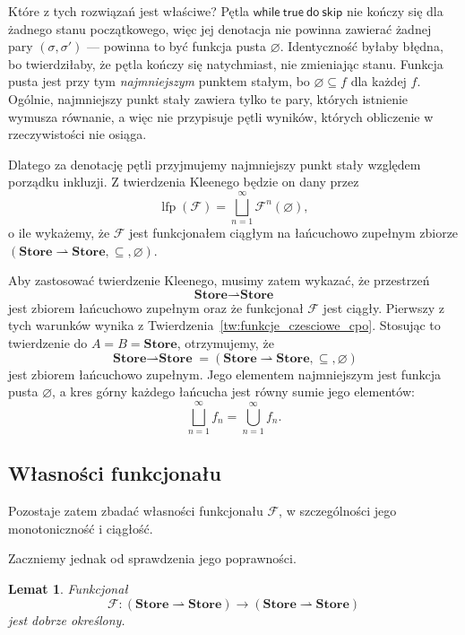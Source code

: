 \documentclass[11pt,a4paper]{article}
\theoremstyle{definition}
\theoremstyle{plain}
\newtheorem{lemat}[definicja]{Lemat}
\newcommand{\lfp}{\operatorname{lfp}}
\newcommand{\Store}{\textbf{Store}}
\newcommand{\kw}[1]{\ensuremath{\mathsf{#1}}} %
\begin{document}
Które z tych rozwiązań jest właściwe? Pętla
$\kw{while}\ \kw{true}\ \kw{do}\ \kw{skip}$ nie kończy się dla żadnego
stanu początkowego, więc jej denotacja nie powinna zawierać żadnej pary
$(\sigma,\sigma')$ --- powinna to być funkcja pusta $\varnothing$.
Identyczność byłaby błędna, bo twierdziłaby, że pętla kończy się
natychmiast, nie zmieniając stanu. Funkcja pusta jest przy tym
\emph{najmniejszym} punktem stałym, bo $\varnothing\subseteq f$ dla
każdej $f$. Ogólnie, najmniejszy punkt stały zawiera tylko te pary,
których istnienie wymusza równanie, a więc nie przypisuje pętli wyników,
których obliczenie w rzeczywistości nie osiąga.

Dlatego za denotację pętli przyjmujemy najmniejszy punkt stały względem
porządku inkluzji. Z twierdzenia Kleenego będzie on dany przez
\[
\lfp(\mathcal F)
=
\bigsqcup_{n=1}^{\infty}\mathcal F^n(\varnothing),
\]
o ile wykażemy, że $\mathcal F$ jest funkcjonałem ciągłym na
łańcuchowo zupełnym zbiorze
$(\Store\rightharpoonup\Store,\subseteq,\varnothing)$.

Aby zastosować twierdzenie Kleenego, musimy zatem wykazać, że przestrzeń
\[
\Store\rightharpoonup\Store
\]
jest zbiorem łańcuchowo zupełnym oraz że funkcjonał $\mathcal F$ jest
ciągły. Pierwszy z tych warunków wynika z
Twierdzenia~\ref{tw:funkcje_czesciowe_cpo}. Stosując to twierdzenie do
$A=B=\Store$, otrzymujemy, że
\[
\boldsymbol{\Store\rightharpoonup\Store}
=
(\Store\rightharpoonup\Store,\subseteq,\varnothing)
\]
jest zbiorem łańcuchowo zupełnym. Jego elementem najmniejszym jest
funkcja pusta $\varnothing$, a kres górny każdego łańcucha jest równy
sumie jego elementów:
\[
\bigsqcup_{n=1}^{\infty}f_n
=
\bigcup_{n=1}^{\infty}f_n.
\]

\subsection{Własności funkcjonału}

Pozostaje zatem zbadać własności funkcjonału $\mathcal{F}$, w
szczególności jego monotoniczność i ciągłość. 

Zaczniemy jednak od sprawdzenia jego poprawności. 

\begin{lemat}\label{lemat:F_dobrze_okreslony}
	Funkcjonał
	\[
	\mathcal{F}:
	(\Store\rightharpoonup\Store)
	\longrightarrow
	(\Store\rightharpoonup\Store)
	\]
	jest dobrze określony.
\end{lemat}
\end{document}
